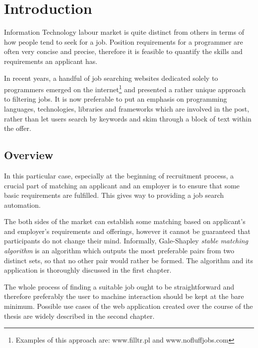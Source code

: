 \chapter{Introduction}
\ifpdf
    \graphicspath{{Introduction/IntroductionFigs/PNG/}{Introduction/IntroductionFigs/PDF/}{Introduction/IntroductionFigs/}}
\else
    \graphicspath{{Introduction/IntroductionFigs/EPS/}{Introduction/IntroductionFigs/}}
\fi

Information Technology labour market is quite distinct from others in terms of how people tend to seek for a job. Position requirements for a programmer are often very concise and precise, therefore it is feasible to quantify the skills and requirements an applicant has.

In recent years, a handful of job searching websites dedicated solely to programmers emerged on the internet\footnote{Examples of this approach are: www.filltr.pl and www.nofluffjobs.com} and presented a rather unique approach to filtering jobs. It is now preferable to put an emphasis on programming languages, technologies, libraries and frameworks which are involved in the post, rather than let users search by keywords and skim through a block of text within the offer.

\section{Overview}
In this particular case, especially at the beginning of recruitment process, a crucial part of matching an applicant and an employer is to ensure that some basic requirements are fulfilled. This gives way to providing a job search automation.

The both sides of the market can establish some matching based on applicant's and employer's requirements and offerings, however it cannot be guaranteed that participants do not change their mind. Informally, Gale-Shapley \textit{stable matching algorithm} is an algorithm which outputs the most preferable pairs from two distinct sets, so that no other pair would rather be formed. The algorithm and its application is thoroughly discussed in the first chapter.

The whole process of finding a suitable job ought to be straightforward and therefore preferably the user to machine interaction should be kept at the bare minimum. Possible use cases of the web application created over the course of the thesis are widely described in the second chapter.

